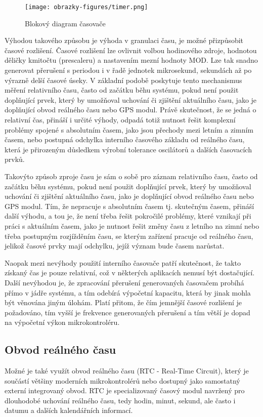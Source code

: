 \begin{figure}[h]
    \centering
    \texttt{[image: obrazky-figures/timer.png]}
    
    \caption{Blokový diagram časovače}
    \label{fig:timer}
\end{figure}

Výhodou takového způsobu je výhoda v granulaci času, je možné přizpůsobit časové rozlišení. Časové rozlišení lze ovlivnit volbou hodinového zdroje, hodnotou děličky kmitočtu (prescaleru) a nastavením mezní hodnoty MOD. Lze tak snadno generovat přerušení s periodou i v řadě jednotek mikrosekund, sekundách až po výrazně delší časové úseky. V základní podobě poskytuje tento mechanismus měření relativního času, často od začátku běhu systému, pokud není použit doplňující prvek, který by umožňoval uchování či zjištění aktuálního času, jako je doplňující obvod reálného času nebo GPS modul. Právě skutečnost, že se jedná o relativní čas, přináší i určité výhody, odpadá totiž nutnost řešit komplexní problémy spojené s absolutním časem, jako jsou přechody mezi letním a zimním časem, nebo postupná odchylka interního časového základu od reálného času, která je přirozeným důsledkem výrobní tolerance oscilátorů a dalších časovacích prvků.

Takovýto způsob zproje času je sám o sobě pro záznam relativního času, často od začátku běhu systému, pokud není použit doplňující prvek, který by umožňoval uchování či zjištění aktuálního času, jako je doplňující obvod reálného času nebo GPS modul. Tím, že nepracuje s absolutním časem tj. skutečným časem, přináší další výhodu, a tou je, že není třeba řešit pokročilé problémy, které vznikají při práci s aktuálním časem, jako je nutnost řešit změny času z letního na zimní nebo třeba postupným rozjížděním času, se kterým zařízení pracuje od reálného času, jelikož časové prvky mají odchylku, jejíž význam bude časem narůstat.

Naopak mezi nevýhody použití interního časovače patří skutečnost, že takto získaný čas je pouze relativní, což v některých aplikacích nemusí být dostačující. Další nevýhodou je, že zpracování přerušení generovaných časovačem probíhá přímo v jádře systému, a tím odebírá výpočetní kapacitu, která by jinak mohla být věnována jiným úlohám. Platí přitom, že čím jemnější časové rozlišení je požadováno, tím vyšší je frekvence generovaných přerušení a tím větší je dopad na výpočetní výkon mikrokontroléru.

\subsection{Obvod reálného času}
Možné je také využít obvod reálného času (RTC - Real-Time Circuit), který je součástí většiny moderních mikrokontrolérů nebo dostupný jako samostatný externí integrovaný obvod. RTC je specializovaný časový modul navržený pro dlouhodobé uchování reálného času, tedy hodin, minut, sekund, ale často i datumu a dalších kalendářních informací.

